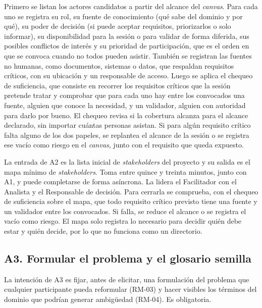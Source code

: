 \documentclass[12pt,letterpaper,oneside]{report}
\begin{document}
Primero se listan los actores candidatos a partir del alcance del
\textit{canvas}. Para cada uno se registra su rol, su fuente de conocimiento
(qué sabe del dominio y por qué), su poder de decisión (si puede aceptar
requisitos, priorizarlos o solo informar), su disponibilidad para la sesión o
para validar de forma diferida, sus posibles conflictos de interés y su
prioridad de participación, que es el orden en que se convoca cuando no
todos pueden asistir. También se registran las fuentes no humanas, como
documentos, sistemas o datos, que respaldan requisitos críticos, con su
ubicación y un responsable de acceso. Luego se aplica el chequeo de
suficiencia, que consiste en recorrer los requisitos críticos que la sesión
pretende tratar y comprobar que para cada uno hay entre los convocados una
fuente, alguien que conoce la necesidad, y un validador, alguien con autoridad
para darlo por bueno. El chequeo revisa si la cobertura alcanza para el
alcance declarado, sin importar cuántas personas asistan. Si para algún requisito crítico
falta alguno de los dos papeles, se replantea el alcance de la sesión o se
registra ese vacío como riesgo en el \textit{canvas}, junto con el requisito
que queda expuesto.

La entrada de A2 es la lista inicial de \textit{stakeholders} del proyecto y su
salida es el mapa mínimo de \textit{stakeholders}. Toma entre quince y treinta
minutos, junto con A1, y puede completarse de forma asíncrona. La lidera el
Facilitador con el Analista y el Responsable de decisión. Para cerrarla se
comprueba, con el chequeo de suficiencia sobre el mapa, que todo requisito
crítico previsto tiene una fuente y un validador entre los convocados. Si
falla, se reduce el alcance o se registra el vacío como riesgo. El mapa solo
registra lo necesario para decidir quién debe estar y quién decide, por lo que
no funciona como un directorio.

\subsection{A3. Formular el problema y el glosario semilla}
La intención de A3 es fijar, antes de elicitar, una formulación del problema que
cualquier participante pueda reformular (RM-03) y hacer visibles los términos
del dominio que podrían generar ambigüedad (RM-04). Es obligatoria.
\end{document}
